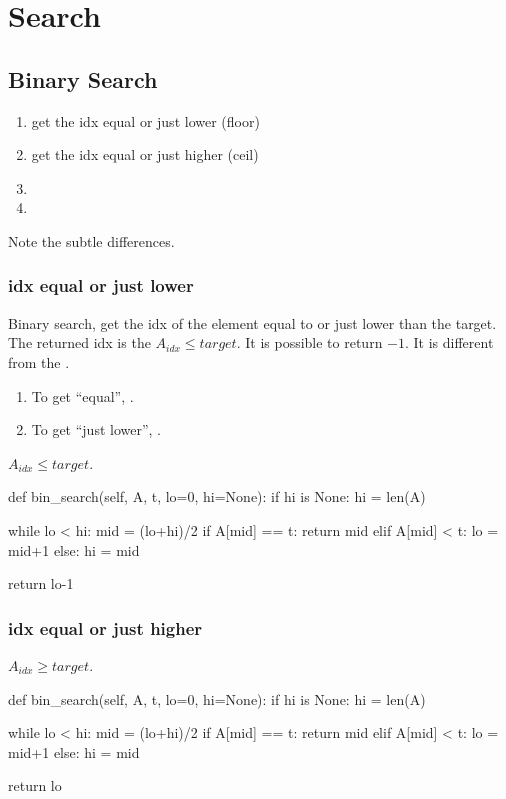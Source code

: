 \chapter{Search}

\section{Binary Search}
\begin{enumerate}
\item get the idx equal or just lower (floor)
\item get the idx equal or just higher (ceil)
\item {}
\item {} 
\end{enumerate}

Note the subtle differences.

\subsection{idx equal or just lower}
Binary search, get the idx of the element equal to or just lower than the target. The returned idx is the $A_{idx} \leq target$. It is possible to return $-1$. It is different from the .

\begin{enumerate}
\item To get ``equal'', .
\item To get ``just lower'', .
\end{enumerate}
$A_{idx} \leq target$.
\begin{python}
def bin_search(self, A, t, lo=0, hi=None):
    if hi is None: hi = len(A)
    
    while lo < hi:
        mid = (lo+hi)/2
        if A[mid] == t:  return mid
        elif A[mid] < t: lo = mid+1
        else:            hi = mid

    return lo-1
\end{python}
\subsection{idx equal or just higher}
$A_{idx} \geq target$.
\begin{python}
def bin_search(self, A, t, lo=0, hi=None):
    if hi is None: hi = len(A)
   
    while lo < hi:
        mid = (lo+hi)/2
        if A[mid] == t:  return mid
        elif A[mid] < t: lo = mid+1
        else:            hi = mid
        
    return lo
\end{python}
